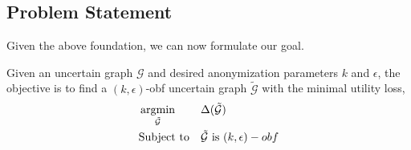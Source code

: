 \subsection{Problem Statement}
Given the above foundation, we can now formulate our goal.  
\vspace{-15pt}
\begin{problem}
     Given an uncertain graph $\mathcal{G}$ and desired anonymization parameters $k$ and $\epsilon$, 
     the objective is to find a  $(k,\epsilon)$-obf uncertain graph $\tilde{\mathcal{G}}$
     with the minimal utility loss,
     \vspace{-5pt}
     \begin{equation*}
             \begin{aligned}
                 & \argmin_{\tilde{
                \mathcal{G}}} & & \Delta(\tilde{\mathcal{G}}) \\
                &  \text{Subject to} & &\tilde{\mathcal{G}} \text{~is~} (k,\epsilon)-obf
            \end{aligned}
     \end{equation*}
     \label{prob:unobf}
\end{problem}
